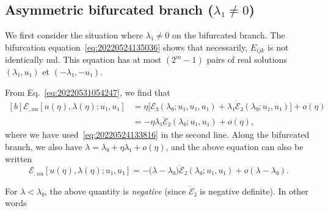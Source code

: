 \documentclass[12pt, final]{scrartcl}
\theoremstyle{definition}
\begin{document}
\subsection{Asymmetric bifurcated branch (\(λ₁ ≠ 0\))}

We first consider the situation where \(λ₁ ≠ 0\) on the bifurcated branch. The
bifurcation equation~\eqref{eq:20220524135036} shows that necessarily,
\(E_{ijk}\) is not identically nul. This equation has at most \((2^m - 1)\)
pairs of real solutions \((λ₁, u₁)\) et \((- λ₁, - u₁)\). 

From Eq.~\eqref{eq:20220531054247}, we find that
\begin{equation}
  \begin{aligned}[b]
    ℰ_{, uu}[u(η), λ(η); u₁, u₁]
    &= η \bigl[ℰ₃(λ₀ ; u₁, u₁, u₁)  + λ₁ \dot{ℰ}₂(λ₀; u₁, u₁)\bigr] + o(η)\\
    &= - η λ₁ \dot{ℰ}₂(λ₀; u₁, u₁) + o(η),
  \end{aligned}
\end{equation}
where we have used~\eqref{eq:20220524133816} in the second line. Along the
bifurcated branch, we also have \(λ = λ₀ + η λ₁ + o(η)\), and the above equation
can also be written
\begin{equation}
  ℰ_{, uu}[u(η), λ(η); u₁, u₁] = -\bigl( λ - λ₀ \bigr) \dot{ℰ}₂(λ₀; u₁, u₁) + o(λ - λ₀).
\end{equation}

For \(λ < λ₀\), the above quantity is \emph{negative} (since \(\dot{ℰ}₂\) is
negative definite). In other words

\begin{center}
\end{center}
\end{document}
